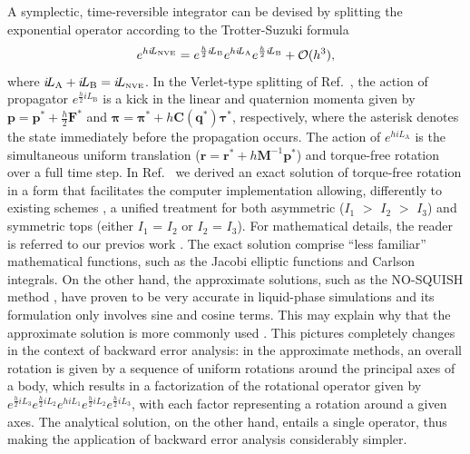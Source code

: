 \documentclass[
journal=jctcce,
layout=twocolumn
]{achemso}
\newcommand{\mt}[1]{\boldsymbol{\mathbf{#1}}}   %
\newcommand{\vt}[1]{\boldsymbol{\mathbf{#1}}}   %
\newcommand{\Liu}[1]{i\!L_\text{#1}}            %
\newcommand{\timestep}{h}
\begin{document}
A symplectic, time-reversible integrator can be devised by splitting the exponential operator according to the Trotter-Suzuki formula \cite{Trotter_1959, Suzuki_1976}
\begin{equation}
\label{eq:splitting NVE}
e^{\timestep \Liu{\tiny NVE}} = e^{\frac{\timestep}{2} \Liu{B}} e^{\timestep \Liu{A}} e^{\frac{\timestep}{2} \Liu{B}} + \mathcal{O}(\timestep^3),
\end{equation}
where $\Liu{A} + \Liu{B} = \Liu{\tiny NVE}$.
In the Verlet-type splitting of Ref.~, the action of propagator $e^{\frac{\timestep}{2} \Liu{B}}$ is a kick in the linear and quaternion momenta given by ${\vt p} = {\vt p}^\ast + \frac{\timestep}{2} {\vt F}^\ast$ and ${\vt \pi} = {\vt \pi}^\ast + \timestep {\mt C}({\vt q^\ast}) {\vt \tau}^\ast$, respectively, where the asterisk denotes the state immediately before the propagation occurs.
The action of $e^{\timestep \Liu{A}}$ is the simultaneous uniform translation (${\vt r} = {\vt r}^\ast + \timestep {\mt M}^{-1} {\vt p}^\ast$) and torque-free rotation over a full time step. In Ref.~ we derived an exact solution of torque-free rotation in a form that facilitates the computer implementation allowing, differently to existing schemes \cite{Kosenko_1998,vanZon2007,Celledoni_2008}, a unified treatment for both asymmetric ($I_1$ $>$ $I_2$ $>$ $I_3$) and symmetric tops (either $I_1$ = $I_2$ or $I_2$ = $I_3$).
For mathematical details, the reader is referred to our previos work \cite{Silveira_2017}.
The exact solution comprise ``less familiar'' mathematical functions, such as the Jacobi elliptic functions and Carlson integrals.
On the other hand, the approximate solutions, such as the NO-SQUISH method  \cite{Miller_2002}, have proven to be very accurate in liquid-phase simulations \cite{Silveira_2017} and its formulation only involves sine and cosine terms.
This may explain why that the approximate solution is more commonly used \cite{vanZon2007}.
This pictures completely changes in the context of backward error analysis: in the approximate methods, an overall rotation is given by a sequence of uniform rotations around the principal axes of a body, which results in a factorization of the rotational operator given by $ e^{\frac{h}{2} i\!L_3} e^{\frac{h}{2} i\!L_2} e^{h i\!L_1} e^{\frac{h}{2} i\!L_2} e^{\frac{h}{2} i\!L_3}$, with each factor representing a rotation around a given axes.
The analytical solution, on the other hand, entails a single operator, thus making the application of backward error analysis considerably simpler.
\end{document}
